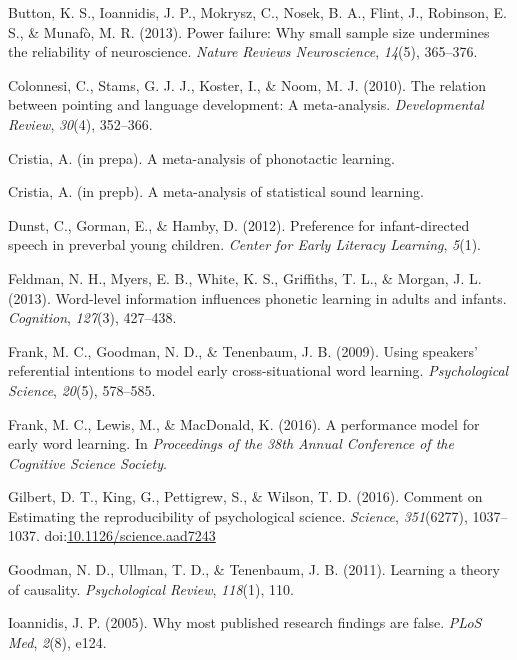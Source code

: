 \documentclass[english,floatsintext,man]{apa6}
\begin{document}
\hypertarget{ref-button2013power}{}
Button, K. S., Ioannidis, J. P., Mokrysz, C., Nosek, B. A., Flint, J.,
Robinson, E. S., \& Munafò, M. R. (2013). Power failure: Why small
sample size undermines the reliability of neuroscience. \emph{Nature
Reviews Neuroscience}, \emph{14}(5), 365--376.

\hypertarget{ref-colonnesi2010relation}{}
Colonnesi, C., Stams, G. J. J., Koster, I., \& Noom, M. J. (2010). The
relation between pointing and language development: A meta-analysis.
\emph{Developmental Review}, \emph{30}(4), 352--366.

\hypertarget{ref-cristiaphonotacticsinprep}{}
Cristia, A. (in prepa). A meta-analysis of phonotactic learning.

\hypertarget{ref-cristiastatisticalinprep}{}
Cristia, A. (in prepb). A meta-analysis of statistical sound learning.

\hypertarget{ref-dunst2012preference}{}
Dunst, C., Gorman, E., \& Hamby, D. (2012). Preference for
infant-directed speech in preverbal young children. \emph{Center for
Early Literacy Learning}, \emph{5}(1).

\hypertarget{ref-feldman2013word}{}
Feldman, N. H., Myers, E. B., White, K. S., Griffiths, T. L., \& Morgan,
J. L. (2013). Word-level information influences phonetic learning in
adults and infants. \emph{Cognition}, \emph{127}(3), 427--438.

\hypertarget{ref-frank2009using}{}
Frank, M. C., Goodman, N. D., \& Tenenbaum, J. B. (2009). Using
speakers' referential intentions to model early cross-situational word
learning. \emph{Psychological Science}, \emph{20}(5), 578--585.

\hypertarget{ref-frank2016performance}{}
Frank, M. C., Lewis, M., \& MacDonald, K. (2016). A performance model
for early word learning. In \emph{Proceedings of the 38th Annual
Conference of the Cognitive Science Society}.

\hypertarget{ref-Gilbert1037}{}
Gilbert, D. T., King, G., Pettigrew, S., \& Wilson, T. D. (2016).
Comment on Estimating the reproducibility of psychological science.
\emph{Science}, \emph{351}(6277), 1037--1037.
doi:\href{https://doi.org/10.1126/science.aad7243}{10.1126/science.aad7243}

\hypertarget{ref-goodman2011learning}{}
Goodman, N. D., Ullman, T. D., \& Tenenbaum, J. B. (2011). Learning a
theory of causality. \emph{Psychological Review}, \emph{118}(1), 110.

\hypertarget{ref-ioannidis2005most}{}
Ioannidis, J. P. (2005). Why most published research findings are false.
\emph{PLoS Med}, \emph{2}(8), e124.
\end{document}
